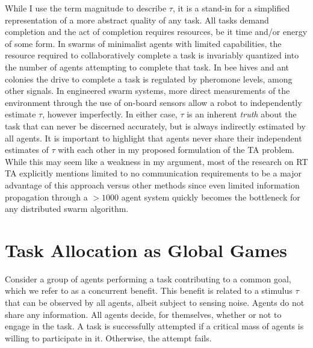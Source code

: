 \documentclass[defaultstyle,12pt]{thesis}
\begin{document}
While I use the term magnitude to describe $\tau$, it is a stand-in for a simplified representation of a more abstract quality of any task. All tasks demand completion and the act of completion requires resources, be it time and/or energy of some form. In swarms of minimalist agents with limited capabilities, the resource required to collaboratively complete a task is invariably quantized into the number of agents attempting to complete that task. In bee hives and ant colonies the drive to complete a task is regulated by pheromone levels, among other signals.  In engineered swarm systems, more direct measurements of the environment through the use of on-board sensors allow a robot to independently estimate $\tau$, however imperfectly. In either case, $\tau$ is an inherent \emph{truth} about the task that can never be discerned accurately, but is always indirectly estimated by all agents. It is important to highlight that agents never share their independent estimates of $\tau$ with each other in my proposed formulation of the TA problem. While this may seem like a weakness in my argument, most of the research on RT TA explicitly mentions limited to no communication requirements to be a major advantage of this approach versus other methods since even limited information propagation through a $>1000$ agent system quickly becomes the bottleneck for any distributed swarm algorithm.

\section{Task Allocation as Global Games}\label{sec:globalgame}
Consider a group of agents performing a task contributing to a common goal, which we refer to as a concurrent benefit. This benefit is related to a stimulus $\tau$ that can be observed by all agents, albeit subject to sensing noise. Agents do not share any information. All agents decide, for themselves, whether or not to engage in the task. A task is successfully attempted if a critical mass of agents is willing to participate in it. Otherwise, the attempt fails.
\end{document}
